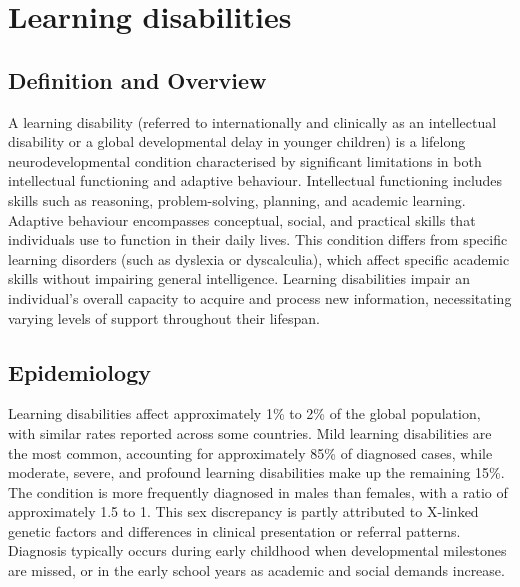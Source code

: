 \chapter{Learning disabilities}

\section*{Definition and Overview}
A learning disability (referred to internationally and clinically as an intellectual disability or a global developmental delay in younger children) is a lifelong neurodevelopmental condition characterised by significant limitations in both intellectual functioning and adaptive behaviour. Intellectual functioning includes skills such as reasoning, problem-solving, planning, and academic learning. Adaptive behaviour encompasses conceptual, social, and practical skills that individuals use to function in their daily lives. This condition differs from specific learning disorders (such as dyslexia or dyscalculia), which affect specific academic skills without impairing general intelligence. Learning disabilities impair an individual's overall capacity to acquire and process new information, necessitating varying levels of support throughout their lifespan.

\section*{Epidemiology}
Learning disabilities affect approximately 1\% to 2\% of the global population, with similar rates reported across some countries. Mild learning disabilities are the most common, accounting for approximately 85\% of diagnosed cases, while moderate, severe, and profound learning disabilities make up the remaining 15\%. The condition is more frequently diagnosed in males than females, with a ratio of approximately 1.5 to 1. This sex discrepancy is partly attributed to X-linked genetic factors and differences in clinical presentation or referral patterns. Diagnosis typically occurs during early childhood when developmental milestones are missed, or in the early school years as academic and social demands increase.

